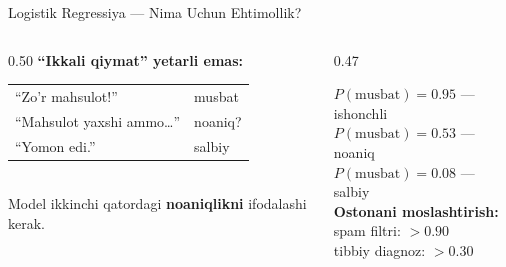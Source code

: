 \documentclass[aspectratio=169,11pt]{beamer}
\begin{document}
\begin{frame}{Logistik Regressiya --- Nima Uchun Ehtimollik?}
  \begin{columns}[T]
    \begin{column}{0.50\textwidth}
      \small
      \textbf{``Ikkali qiymat'' yetarli emas:}\\[5pt]
      \begin{tabular}{@{}p{4.5cm}l@{}}
        ``Zo'r mahsulot!'' & musbat \\[2pt]
        ``Mahsulot yaxshi ammo\ldots'' & noaniq? \\[2pt]
        ``Yomon edi.'' & salbiy \\
      \end{tabular}
      \vspace{6pt}\\
      Model ikkinchi qatordagi
      \textbf{noaniqlikni} ifodalashi kerak.
    \end{column}
    \begin{column}{0.47\textwidth}
      \begin{tcolorbox}[defbox,title=Ehtimollik beradi]
        \small
        $P(\text{musbat})=0.95$ --- ishonchli\\[2pt]
        $P(\text{musbat})=0.53$ --- noaniq\\[2pt]
        $P(\text{musbat})=0.08$ --- salbiy\\[4pt]
        \textbf{Ostonani moslashtirish:}\\
        spam filtri: $>\!0.90$\\
        tibbiy diagnoz: $>\!0.30$
      \end{tcolorbox}
    \end{column}
  \end{columns}
\end{frame}
\end{document}
